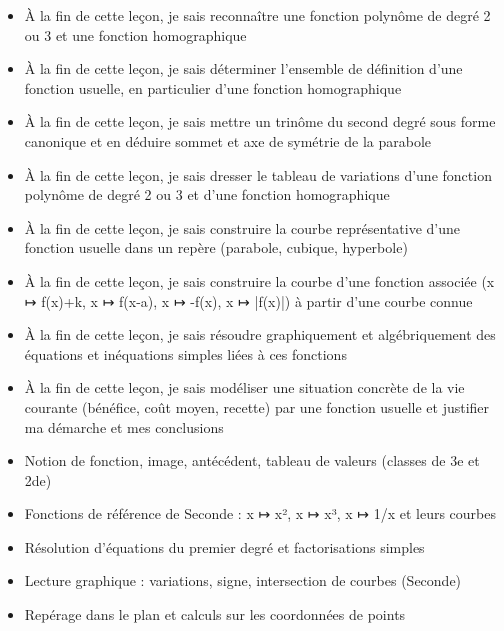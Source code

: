 \documentclass[11pt]{article}
\begin{document}
\begin{objectifs}
\begin{itemize}
\item À la fin de cette leçon, je sais reconnaître une fonction polynôme de degré 2 ou 3 et une fonction homographique
\item À la fin de cette leçon, je sais déterminer l'ensemble de définition d'une fonction usuelle, en particulier d'une fonction homographique
\item À la fin de cette leçon, je sais mettre un trinôme du second degré sous forme canonique et en déduire sommet et axe de symétrie de la parabole
\item À la fin de cette leçon, je sais dresser le tableau de variations d'une fonction polynôme de degré 2 ou 3 et d'une fonction homographique
\item À la fin de cette leçon, je sais construire la courbe représentative d'une fonction usuelle dans un repère (parabole, cubique, hyperbole)
\item À la fin de cette leçon, je sais construire la courbe d'une fonction associée (x ↦ f(x)+k, x ↦ f(x-a), x ↦ -f(x), x ↦ |f(x)|) à partir d'une courbe connue
\item À la fin de cette leçon, je sais résoudre graphiquement et algébriquement des équations et inéquations simples liées à ces fonctions
\item À la fin de cette leçon, je sais modéliser une situation concrète de la vie courante (bénéfice, coût moyen, recette) par une fonction usuelle et justifier ma démarche et mes conclusions
\end{itemize}
\end{objectifs}

\begin{prerequis}
\begin{itemize}
\item Notion de fonction, image, antécédent, tableau de valeurs (classes de 3e et 2de)
\item Fonctions de référence de Seconde : x ↦ x², x ↦ x³, x ↦ 1/x et leurs courbes
\item Résolution d'équations du premier degré et factorisations simples
\item Lecture graphique : variations, signe, intersection de courbes (Seconde)
\item Repérage dans le plan et calculs sur les coordonnées de points
\end{itemize}
\end{prerequis}
\end{document}
